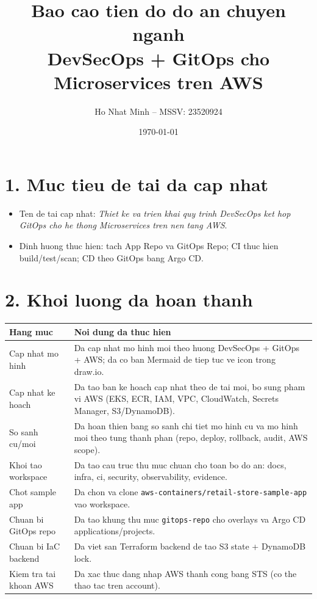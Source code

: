 \documentclass[12pt,a4paper]{article}
\title{Bao cao tien do do an chuyen nganh\\
DevSecOps + GitOps cho Microservices tren AWS}
\author{Ho Nhat Minh -- MSSV: 23520924}
\date{\today}
\begin{document}
\maketitle

\section*{1. Muc tieu de tai da cap nhat}
\begin{itemize}[leftmargin=*]
  \item Ten de tai cap nhat: \textit{Thiet ke va trien khai quy trinh DevSecOps ket hop GitOps cho he thong Microservices tren nen tang AWS}.
  \item Dinh huong thuc hien: tach App Repo va GitOps Repo; CI thuc hien build/test/scan; CD theo GitOps bang Argo CD.
\end{itemize}

\section*{2. Khoi luong da hoan thanh}
\begin{longtable}{p{} p{}}
\textbf{Hang muc} & \textbf{Noi dung da thuc hien} \\
\hline
Cap nhat mo hinh & Da cap nhat mo hinh moi theo huong DevSecOps + GitOps + AWS; da co ban Mermaid de tiep tuc ve icon trong draw.io. \\
Cap nhat ke hoach & Da tao ban ke hoach cap nhat theo de tai moi, bo sung pham vi AWS (EKS, ECR, IAM, VPC, CloudWatch, Secrets Manager, S3/DynamoDB). \\
So sanh cu/moi & Da hoan thien bang so sanh chi tiet mo hinh cu va mo hinh moi theo tung thanh phan (repo, deploy, rollback, audit, AWS scope). \\
Khoi tao workspace & Da tao cau truc thu muc chuan cho toan bo do an: docs, infra, ci, security, observability, evidence. \\
Chot sample app & Da chon va clone \texttt{aws-containers/retail-store-sample-app} vao workspace. \\
Chuan bi GitOps repo & Da tao khung thu muc \texttt{gitops-repo} cho overlays va Argo CD applications/projects. \\
Chuan bi IaC backend & Da viet san Terraform backend de tao S3 state + DynamoDB lock. \\
Kiem tra tai khoan AWS & Da xac thuc dang nhap AWS thanh cong bang STS (co the thao tac tren account). \\
\end{longtable}
\end{document}
